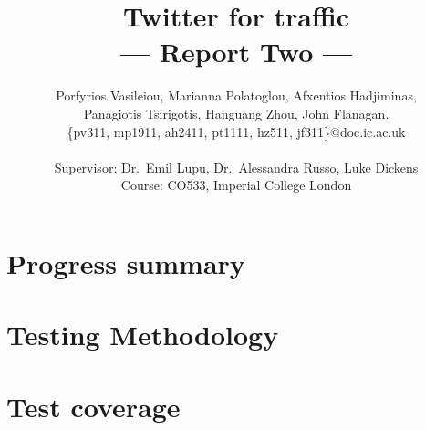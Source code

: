 \documentclass[a4paper,11pt]{article}
\title{Twitter for traffic\\\Large{--- Report Two ---}}
\author{Porfyrios Vasileiou, Marianna Polatoglou, Afxentios Hadjiminas,\\
        Panagiotis Tsirigotis, Hanguang Zhou, John Flanagan.\\
       \{pv311, mp1911, ah2411, pt1111, hz511, jf311\}@doc.ic.ac.uk\\ \\
       \small{Supervisor: Dr.\ Emil Lupu, Dr.\ Alessandra Russo, Luke Dickens}\\
       \small{Course: CO533, Imperial College London}
}
\begin{document}
\maketitle

\section{Progress summary}
	

\section{Testing Methodology}
	

\section{Test coverage}
	

%	
%	
\end{document}
